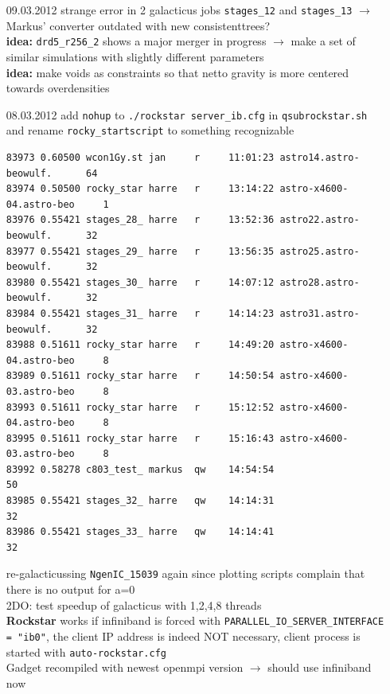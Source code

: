 \begin{itemize}
\item[09.03.2012]
strange error in 2 galacticus jobs \texttt{stages\_12} and 
\texttt{stages\_13}  $\rightarrow$ Markus' converter 
outdated with new consistenttrees? \\
\textbf{idea:} \texttt{drd5\_r256\_2} shows a major merger in progress 
$\rightarrow$ make a set of similar simulations with 
slightly different parameters \\
\textbf{idea:} make voids as constraints so that netto gravity is 
more centered towards overdensities \\

\item[08.03.2012]
add \texttt{nohup} to \texttt{./rockstar server\_ib.cfg} 
in \texttt{qsubrockstar.sh} and rename \texttt{rocky\_startscript}
to something recognizable 
\begin{verbatim}
83973 0.60500 wcon1Gy.st jan     r     11:01:23 astro14.astro-beowulf.      64        
83974 0.50500 rocky_star harre   r     13:14:22 astro-x4600-04.astro-beo     1        
83976 0.55421 stages_28_ harre   r     13:52:36 astro22.astro-beowulf.      32        
83977 0.55421 stages_29_ harre   r     13:56:35 astro25.astro-beowulf.      32        
83980 0.55421 stages_30_ harre   r     14:07:12 astro28.astro-beowulf.      32        
83984 0.55421 stages_31_ harre   r     14:14:23 astro31.astro-beowulf.      32        
83988 0.51611 rocky_star harre   r     14:49:20 astro-x4600-04.astro-beo     8        
83989 0.51611 rocky_star harre   r     14:50:54 astro-x4600-03.astro-beo     8        
83993 0.51611 rocky_star harre   r     15:12:52 astro-x4600-04.astro-beo     8        
83995 0.51611 rocky_star harre   r     15:16:43 astro-x4600-03.astro-beo     8        
83992 0.58278 c803_test_ markus  qw    14:54:54                             50        
83985 0.55421 stages_32_ harre   qw    14:14:31                             32        
83986 0.55421 stages_33_ harre   qw    14:14:41                             32     
\end{verbatim}
re-galacticussing \texttt{NgenIC\_15039} again since 
plotting scripts complain that there is no output for 
a=0 \\
2DO: test speedup of galacticus with 1,2,4,8 threads \\
\textbf{Rockstar} works if infiniband is forced with 
\texttt{PARALLEL\_IO\_SERVER\_INTERFACE = "ib0"}, 
the client IP address is indeed NOT necessary, 
client process is started with \texttt{auto-rockstar.cfg} \\
Gadget recompiled with newest openmpi version $\rightarrow$ 
should use infiniband now \\


\end{itemize}
